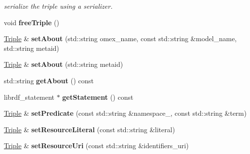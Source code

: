 \begin{DoxyCompactItemize}
\begin{DoxyCompactList}\small\item\em serialize the triple using a  serializer. \end{DoxyCompactList}\item 
\mbox{\label{classomexmeta_1_1Triple_a3f3868622349d3a3e14ed3e4b21d49a9}} 
void {\bfseries free\+Triple} ()
\item 
\mbox{\label{classomexmeta_1_1Triple_a2b673a8166a19fb4feae0fc42d31c105}} 
\hyperlink{classomexmeta_1_1Triple}{Triple} \& {\bfseries set\+About} (std\+::string omex\+\_\+name, const std\+::string \&model\+\_\+name, std\+::string metaid)
\item 
\mbox{\label{classomexmeta_1_1Triple_a6329b09efb05005d248790e8a3d507f3}} 
\hyperlink{classomexmeta_1_1Triple}{Triple} \& {\bfseries set\+About} (std\+::string metaid)
\item 
\mbox{\label{classomexmeta_1_1Triple_a69df88d19e2f9077fccfa9543dadd15f}} 
std\+::string {\bfseries get\+About} () const
\item 
\mbox{\label{classomexmeta_1_1Triple_a886240fe50becaaa47ca171f2d454ba4}} 
librdf\+\_\+statement $\ast$ {\bfseries get\+Statement} () const
\item 
\mbox{\label{classomexmeta_1_1Triple_a57b4521321178af38415e76cd483207e}} 
\hyperlink{classomexmeta_1_1Triple}{Triple} \& {\bfseries set\+Predicate} (const std\+::string \&namespace\+\_\+, const std\+::string \&term)
\item 
\mbox{\label{classomexmeta_1_1Triple_a7358812badc8d0d5589a0165af4ad375}} 
\hyperlink{classomexmeta_1_1Triple}{Triple} \& {\bfseries set\+Resource\+Literal} (const std\+::string \&literal)
\item 
\mbox{\label{classomexmeta_1_1Triple_ae6836c6e9d06a310a120345aa95a4daa}} 
\hyperlink{classomexmeta_1_1Triple}{Triple} \& {\bfseries set\+Resource\+Uri} (const std\+::string \&identifiers\+\_\+uri)
\item 
\mbox{\label{classomexmeta_1_1Triple_a90ffe9b74d354cc3fe3132a07546f6d1}} 

\end{DoxyCompactItemize}
